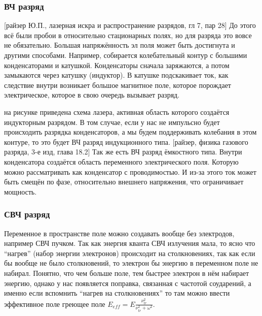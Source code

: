 \documentclass[10pt, a4paper]{article}
\numberwithin{equation}{section}
\begin{document}
\subsubsection{ВЧ разряд}
[райзер Ю.П., лазерная искра и распространение разрядов, гл 7, пар 28]
До этого всё были пробои в относительно стационарных полях, но для разряда это вовсе не обязательно. Большая напряжённость эл поля может быть достигнута и другими способами. Например, собирается колебательный контур с большими конденсаторами и катушкой. Конденсаторы сначала заряжаются, а потом замыкаются через катушку (индуктор). В катушке подскакивает ток, как следствие внутри возникает большое магнитное поле, которое порождает электрическое, которое в свою очередь вызывает разряд.
\begin{figure}[h!]
\end{figure}
на рисунке приведена схема лазера, активная область которого создаётся индукторным разрядом.
В том случае, если у нас не импульсно будет происходить разрядка конденсаторов, а мы будем поддерживать колебания в этом контуре, то это будет ВЧ разряд индукционного типа.
[райзер, физика газового разряда, 3-е изд, глава 18.2]
Так же есть ВЧ разряд ёмкостного типа. Внутри конденсатора создаётся область переменного электрического поля. Которую можно рассматривать как конденсатор с проводимостью. И из-за этого ток может быть смещён по фазе, относительно внешнего напряжения, что ограничивает мощность.
\subsubsection{СВЧ разряд}
Переменное в пространстве поле можно создавать вообще без электродов, например СВЧ пучком. Так как энергия кванта СВЧ излучения мала, то ясно что “нагрев” (набор энергии электронов) происходит на столкновениях,  так как если бы вообще не было столкновений, то электрон бы энергию в переменном поле не набирал. Понятно, что чем больше поле, тем быстрее электрон в нём набирает энергию, однако у нас появляется поправка, связанная с частотой соударений, а именно если вспомнить “нагрев на столкновениях” то там можно ввести эффективное поле греющее поле $E_{eff}=E \frac{\nu_{tr}^{2}}{\nu_{tr}^{2}+\omega^{2}}$. 
\end{document}
